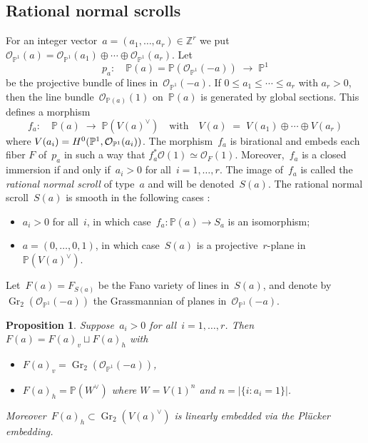\documentclass[a4paper]{amsart}
\newcommand{\bbP}{\mathbb{P}}
\newcommand{\bbZ}{\mathbb{Z}}
\newcommand{\cO}{\mathcal{O}}
\newcommand{\rH}{\textup{H}}
\newcommand{\too}{\longrightarrow}
\newcommand{\iso}{\simeq}
\DeclareMathOperator{\Gr}{Gr}
\renewcommand{\le}{\leqslant}
\theoremstyle{plain}
\newtheorem{proposition}[theorem]{Proposition}
\theoremstyle{definition}
\numberwithin{equation}{section}
\begin{document}
\subsection{Rational normal scrolls} For an integer vector~$a = (a_1, \dots, a_r) \in \bbZ^r$ we put~$\cO_{\bbP^1}(a)  =  \cO_{\bbP^1}(a_1) \oplus \cdots \oplus \cO_{\bbP^1}(a_r)$. Let
\[p_a \colon \quad \bbP(a) = \bbP(\cO_{\bbP^1}(-a)) \; \too \; \bbP^1\] 
%
be the projective bundle of lines in~$\cO_{\bbP^1}(-a)$. If 
$ 0 \le a_1 \le \cdots \le a_r$ with $a_r > 0$, then the line bundle~$\cO_{\bbP(a)}(1)$ on~$\bbP(a)$ is generated by global sections. This defines a morphism
%
\[ f_a \colon \quad \bbP(a) \;\too\; \bbP(V(a)^\vee)
\quad \text{with} \quad V(a) \; = \; V(a_1) \oplus \cdots \oplus V(a_r) 
 \]
%
where $V(a_i) = \rH^0(\bbP^1, \cO_{\bbP^1}(a_i))$. 
The morphism~$f_a$ is birational and embeds each fiber $F$ of~$p_a$ in such a way that $f_a^\ast \cO(1) \iso \cO_F(1)$. Moreover,~$f_a$ is a closed immersion if and only if~$a_i > 0$ for all~$i = 1, \dots, r$. The image of~$f_a$ is called the \emph{rational normal scroll} of type~$a$ and will be denoted~$S(a)$. The rational normal scroll~$S(a)$ is smooth in the following cases \cite[p.~6]{EisenbudHarrisMinimalDegree}:
\begin{itemize}
\item $a_i > 0$ for all~$i$, in which case~$f_a \colon \bbP(a) \to S_a$ is an isomorphism; \smallskip
\item $a = (0, \dots, 0, 1)$, in which case~$S(a)$ is a projective~$r$-plane in~$\bbP(V(a)^\vee)$.\smallskip
\end{itemize}
Let~$F(a) = F_{S(a)}$ be the Fano variety of lines in~$S(a)$, and denote by~$\Gr_2(\cO_{\bbP^1}(-a))$ the Grassmannian of planes in~$\cO_{\bbP^1}(-a)$. 

\begin{proposition} \label{prop:FanoVarietiesOfScrolls} 
Suppose~$a_i > 0$ for all~$i = 1, \dots, r$. Then $F(a)=F(a)_v\sqcup F(a)_h$ with
\begin{itemize}
\item $F(a)_v = \Gr_2(\cO_{\bbP^1}(-a))$, \medskip
\item $F(a)_h = \bbP(W^\vee)$ where $W = V(1)^n$ and $n = |\{ i : a_i = 1\}|$.\smallskip
\end{itemize}
Moreover~$F(a)_h \subset \Gr_2(V(a)^\vee)$ is linearly embedded via the Pl\"ucker embedding. 
\end{proposition}
\end{document}
